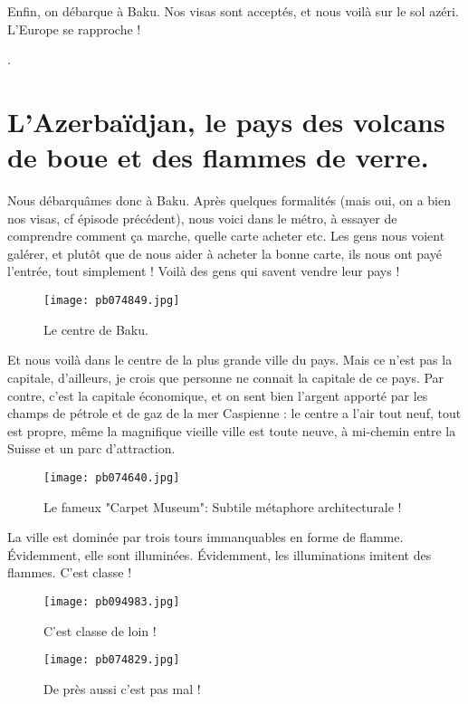 \documentclass{book}
\begin{document}
Enfin, on débarque à Baku. Nos visas sont acceptés, et nous voilà sur le sol azéri. L'Europe se rapproche !

.



\chapter{L'Azerbaïdjan, le pays des volcans de boue et des flammes de verre.}
Nous débarquâmes donc à Baku. Après quelques formalités (mais oui, on a bien nos visas, cf épisode précédent), nous voici dans le métro, à essayer de comprendre comment ça marche, quelle carte acheter etc. Les gens nous voient galérer, et plutôt que de nous aider à acheter la bonne carte, ils nous ont payé l'entrée, tout simplement ! Voilà des gens qui savent vendre leur pays !


\begin{figure}[h]
\centering
\texttt{[image: pb074849.jpg]}
\caption*{Le centre de Baku.}
\end{figure}

Et nous voilà dans le centre de la plus grande ville du pays. Mais ce n'est pas la capitale, d'ailleurs, je crois que personne ne connait la capitale de ce pays. Par contre, c'est la capitale économique, et on sent bien l'argent apporté par les champs de pétrole et de gaz de la mer Caspienne : le centre a l'air tout neuf, tout est propre, même la magnifique vieille ville est toute neuve, à mi-chemin entre la Suisse et un parc d'attraction.


\begin{figure}[h]
\centering
\texttt{[image: pb074640.jpg]}
\caption*{Le fameux "Carpet Museum": Subtile métaphore architecturale !}
\end{figure}

La ville est dominée par trois tours immanquables en forme de flamme. Évidemment, elle sont illuminées. Évidemment, les illuminations imitent des flammes. C'est classe !


\begin{figure}[h]
\centering
\texttt{[image: pb094983.jpg]}
\caption*{C'est classe de loin !}
\end{figure}


\begin{figure}[h]
\centering
\texttt{[image: pb074829.jpg]}
\caption*{De près aussi c'est pas mal !}
\end{figure}
\end{document}
